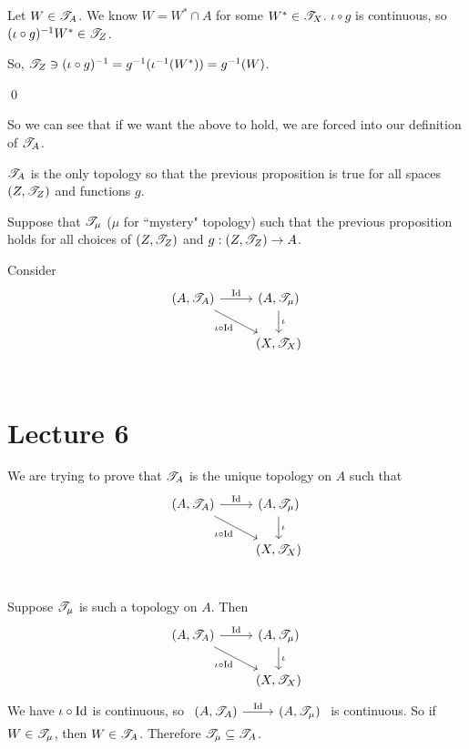\documentclass[x11names,reqno,14pt]{extarticle}
\begin{document}
Let $W \in \mathscr{T}_A$. We know $W = W^*\cap A$ for some $W^* \in \mathscr{T}_X$. $\iota \circ g$ is continuous, so $(\iota \circ g)^{-1}W^*\in\mathscr{T}_Z$. 

So, $\mathscr{T}_Z\ni(\iota\circ g)^{-1} = g^{-1}(\iota^{-1}(W^*)) = g^{-1}(W)$. 

\qed

So we can see that if we want the above to hold, we are forced into our definition of $\mathscr{T}_A$. 

\prop

$\mathscr{T}_A$ is the only topology so that the previous proposition is true for all spaces $(Z, \mathscr{T}_Z)$ and functions $g$. 

\proof

Suppose that $\mathscr{T}_{\mu}$ ($\mu$ for ``mystery" topology) such that the previous proposition holds for all choices of $(Z, \mathscr{T}_Z)$ and $g:(Z,\mathscr{T}_Z)\to A$.  

Consider 
\[
\begin{tikzcd}
(A,\ms{T}_A)\arrow[rd, "\iota \circ \Id"'] \arrow[r, "\Id"] & (A, \ms{T}_\mu) \arrow[d, "\iota"] \\
& (X, \ms{T}_X) \\
\end{tikzcd}
\]

\section*{Lecture 6}

We are trying to prove that $\mathscr{T}_A$ is the unique topology on $A$ such that
\[
\begin{tikzcd}
(A, \ms{T}_A) \arrow[rd,"\iota\circ\Id"']\arrow[r, "\Id"] & (A, \ms{T}_\mu)\arrow[d, "\iota"] \\
& (X, \ms{T}_X) \\
\end{tikzcd}
\]

\proof

Suppose $\mathscr{T}_\mu$ is such a topology on $A$. Then 
\[
\begin{tikzcd}
(A, \ms{T}_A)\arrow[rd, "\iota\circ\Id"']\arrow[r,"\Id"] & (A, \ms{T}_\mu) \arrow[d, "\iota"] \\ & (X, \ms{T}_X) 
\end{tikzcd}
\]
We have $\iota\circ\operatorname{\mathrm{Id}}$ is continuous, so $\begin{tikzcd}( A,\ms{T}_A)\arrow[r, "\Id"] & (A,\ms{T}_\mu) \end{tikzcd}$ is continuous. So if $W\in\mathscr{T}_\mu$, then $W \in \mathscr{T}_A$. Therefore $\mathscr{T}_\mu\subseteq\mathscr{T}_A$. 
\end{document}
